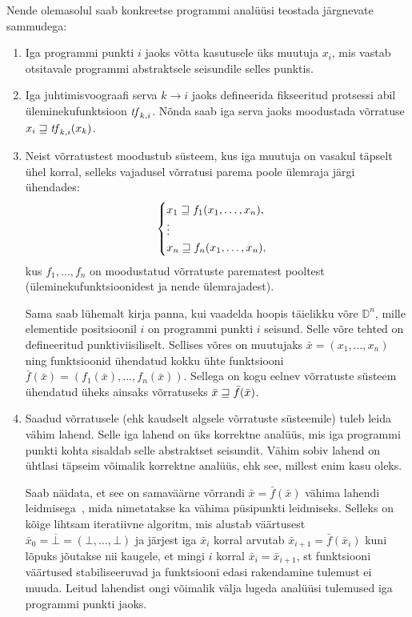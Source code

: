 \documentclass[../thesis.tex]{subfiles}
\begin{document}
Nende olemasolul saab konkreetse programmi analüüsi teostada järgnevate sammudega:
\begin{enumerate}
	\item Iga programmi punkti $i$ jaoks võtta kasutusele üks muutuja $x_i$, mis vastab otsitavale programmi abstraktsele seisundile selles punktis.

	\item Iga juhtimisvoograafi serva $k \rightarrow i$ jaoks defineerida fikseeritud protsessi abil üleminekufunktsioon $\mathit{tf}_{k,i}$. Nõnda saab iga serva jaoks moodustada võrratuse $x_i \sqsupseteq \mathit{tf}_{k,i}(x_k)$.

	\item Neist võrratustest moodustub süsteem, kus iga muutuja on vasakul täpselt ühel korral, selleks vajadusel võrratusi parema poole ülemraja järgi ühendades:
	\[
		\begin{cases}
			x_1 \sqsupseteq f_1(x_1, \ldots, x_n), \\
			\vdots \\
			x_n \sqsupseteq f_n(x_1, \ldots, x_n),
		\end{cases}
	\]
	kus $f_1, \ldots, f_n$ on moodustatud võrratuste parematest pooltest (üleminekufunktsioonidest ja nende ülemrajadest).

	Sama saab lühemalt kirja panna, kui vaadelda hoopis täielikku võre $\mathbb{D}^n$, mille elementide positsioonil $i$ on programmi punkti $i$ seisund. Selle võre tehted on defineeritud punktiviisiliselt.
	Sellises võres on muutujaks $\bar{x} = (x_1, \ldots, x_n)$ ning funktsioonid ühendatud kokku ühte funktsiooni $\bar{f}(\bar{x}) = (f_1(\bar{x}), \ldots, f_n(\bar{x}))$. Sellega on kogu eelnev võrratuste süsteem ühendatud üheks ainsaks võrratuseks $\bar{x} \sqsupseteq \bar{f}(\bar{x})$.

	\item Saadud võrratusele (ehk kaudselt algsele võrratuste süsteemile) tuleb leida vähim lahend. Selle iga lahend on üks korrektne analüüs, mis iga programmi punkti kohta sisaldab selle abstraktset seisundit. Vähim sobiv lahend on ühtlasi täpseim võimalik korrektne analüüs, ehk see, millest enim kasu oleks.

	Saab näidata, et see on samaväärne võrrandi $\bar{x} = \bar{f}(\bar{x})$ vähima lahendi leidmisega~\cite[21]{seidl_foundations}, mida nimetatakse ka vähima püsipunkti leidmiseks. Selleks on kõige lihtsam iteratiivne algoritm, mis alustab väärtusest $\bar{x}_0 = \overline{\bot} = (\bot, \ldots, \bot)$ ja järjest iga $\bar{x}_i$ korral arvutab $\bar{x}_{i+1} = \bar{f}(\bar{x}_i)$ kuni lõpuks jõutakse nii kaugele, et mingi $i$ korral $\bar{x}_i = \bar{x}_{i+1}$, st funktsiooni väärtused stabiliseeruvad ja funktsiooni edasi rakendamine tulemust ei muuda. Leitud lahendist ongi võimalik välja lugeda analüüsi tulemused iga programmi punkti jaoks.
\end{enumerate}
\end{document}
